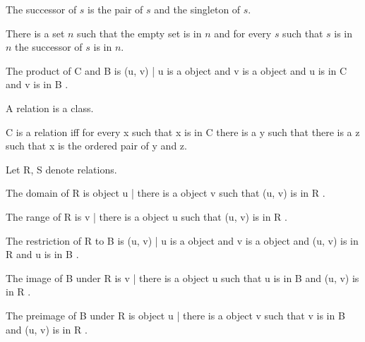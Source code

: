 \documentclass{article}
\begin{document}
\begin{forthel}
    \begin{definition}
      The successor of $s$ is the pair of $s$ and the singleton of $s$.
    \end{definition}

    \begin{axiom}[Inf]
      There is a set $n$ such that the empty set is in $n$ and for every $s$
        such that $s$ is in $n$ the successor of $s$ is in $n$.
    \end{axiom}

    \begin{definition}
      The product of C and B is { (u, v) | u is a object and v is a object and u is in C and v is in B }.
    \end{definition}

    \begin{signature}
      A relation is a class.
    \end{signature}

    \begin{axiom}[RelationIntro]
      C is a relation iff for every x such that x is in C
        there is a y such that there is a z such that x is the ordered pair of y and z.
    \end{axiom}

    Let R, S denote relations.

    \begin{definition} 
      The domain of R is { object u | there is a object v such that (u, v) is in R }.
    \end{definition}

    \begin{definition} 
      The range of R is { v | there is a object u such that (u, v) is in R }.
    \end{definition}

    \begin{definition} 
      The restriction of R to B is { (u, v) | u is a object and v is a object and (u, v) is in R and u is in B }.
    \end{definition}

    \begin{definition} 
      The image of B under R is { v | there is a object u such that u is in B and (u, v) is in R }.
    \end{definition}

    \begin{definition} 
      The preimage of B under R is { object u | there is a object v such that v is in B and (u, v) is in R }.
    \end{definition}


\end{forthel}
\end{document}
